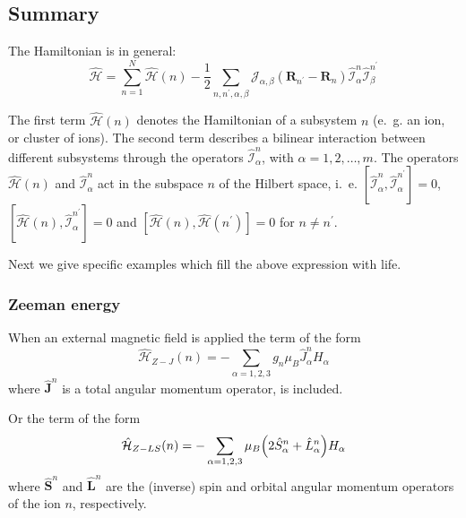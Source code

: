 \documentclass[twoside]{article}
\begin{document}
\clearpage
{\small
\subsection{Summary}

The Hamiltonian is in general:
\begin{equation}
    \hat{\mathcal{H}}
    =
    \sum_{n=1}^{N}
    \hat{\mathcal{H}}(n)
    -
    \frac{1}{2}
    \sum_{n,n^{\prime},\alpha,\beta}
    \mathcal{J}_{\alpha,\beta}(\mathbf{R}_{n^{\prime}} - \mathbf{R}_{n})
    \hat{\mathcal{I}}_{\alpha}^n
    \hat{\mathcal{I}}_{\beta}^{n^{\prime}}
\end{equation}

The first term $\hat{\mathcal{H}}(n)$ denotes the Hamiltonian of a
subsystem $n$ (e.~g. an ion, or cluster of ions). The second term
describes a bilinear interaction between different subsystems through the
operators $\hat{\mathcal{I}}_{\alpha}^n$, with $\alpha = 1, 2, \dots, m$.
The operators $\hat{\mathcal{H}}(n)$ and $\hat{\mathcal{I}}_{\alpha}^n$
act in the subspace $n$ of the Hilbert space, i.~e. 
$[\hat{\mathcal{I}}_{\alpha}^n, \hat{\mathcal{I}}_{\alpha}^{n^{\prime}}] = 0$,
$[\hat{\mathcal{H}}(n), \hat{\mathcal{I}}_{\alpha}^{n^{\prime}}] = 0$
and
$[\hat{\mathcal{H}}(n), \hat{\mathcal{H}}(n^{\prime})] = 0$
for $n \ne n^{\prime}$.

Next we give specific examples which fill the above expression with life.


\subsubsection{Zeeman energy}

When an external magnetic field is applied the term of the form 
\begin{equation}
    \hat{\mathcal{H}}_{Z-J}(n)
    =
    -
    \sum_{\alpha=1,2,3}
    g_n
    \mu_B
    \hat{J}^{n}_{\alpha}
    H_{\alpha}
\end{equation}
where $\hat{\mathbf{J}}^n$ is a total angular momentum operator, is included.

Or the term of the form
\begin{equation}
    \hat{\mathcal{H}}_{Z-LS}(n)
    =
    -
    \sum_{\alpha=1,2,3}
    \mu_B
    \Bigl(
        2 \hat{S}^n_{\alpha} + \hat{L}^n_{\alpha}
    \Bigr)
    H_{\alpha}
\end{equation}
where $\hat{\mathbf{S}}^n$ and $\hat{\mathbf{L}}^n$ are the (inverse)
spin and orbital angular momentum operators of the ion $n$, respectively.

}
\end{document}

